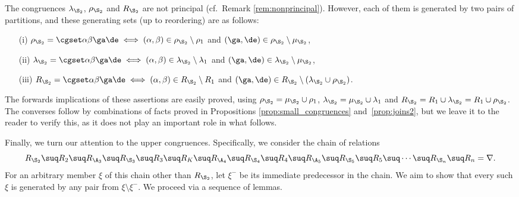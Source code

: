 \begin{rem}
\label{NotPrinc}
The congruences $\lambda_{\S_2}$, $\rho_{\S_2}$ and $R_{\S_2}$ are not principal (cf.~Remark \ref{rem:nonprincipal}).
However, each of them is generated by two pairs of partitions, and these generating sets (up to reordering) are as follows:
\begin{itemize}
\item[(i)] $\rho_{\S_2}=\cgset\alpha\beta\ga\de\iff (\alpha,\beta)\in\rho_{\S_2}\setminus \rho_1$ and $(\ga,\de)\in \rho_{\S_2}\setminus\mu_{\S_2}$,
\item[(ii)] $\lambda_{\S_2}=\cgset\alpha\beta\ga\de\iff (\alpha,\beta)\in\lambda_{\S_2}\setminus \lambda_1$ and $(\ga,\de)\in \lambda_{\S_2}\setminus\mu_{\S_2}$,
\item[(iii)] $R_{\S_2}=\cgset\alpha\beta\ga\de\iff (\alpha,\beta)\in R_{\S_2}\setminus R_1$ and $(\ga,\de)\in R_{\S_2}\setminus (\lambda_{\S_2}\cup\rho_{\S_2})$.
\end{itemize}
The forwards implications of these assertions are easily proved, using $\rho_{\S_2}=\mu_{\S_2}\cup\rho_1$,
$\lambda_{\S_2}=\mu_{\S_2}\cup\lambda_1$ and $R_{\S_2}=R_1\cup \lambda_{\S_2}=R_1\cup\rho_{\S_2}$.
%
The converses follow by combinations of facts proved in Propositions \ref{prop:small_congruences} and~\ref{prop:joins2}, but we leave it to the reader to verify this, as it does not play an important role in what follows.
\end{rem}



Finally, we turn our attention to the upper congruences. Specifically, we consider the chain of relations
\begin{equation}
\label{eqaa1}
R_{\S_2}\suq R_2 \suq R_{\A_3}\suq R_{\S_3}\suq
R_3\suq R_K \suq R_{\A_4}\suq R_{\S_4}\suq
R_4\suq R_{\A_5}\suq R_{\S_5}\suq R_5\suq\cdots
\suq R_{\S_n}\suq R_n=\nabla.
\end{equation}
For an arbitrary member $\xi$ of this chain other than $R_{\S_2}$, let
$\xi^-$ be its immediate predecessor in the chain.
We aim to show that every such $\xi$ is generated by any pair from $\xi\setminus \xi^-$.
We proceed via  a sequence of lemmas.


